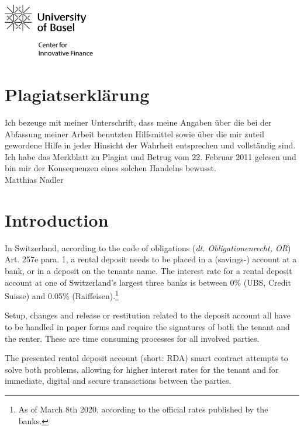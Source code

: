 \documentclass[12pt,a4paper,titlepage,oneside,english]{article}
\begin{document}
\newpage
{}
\tableofcontents
\vfill
\begin{center}
\includegraphics[width=4cm]{../assetlib/images/logo_cif.png}
\end{center}
\singlespacing
\vspace{-1.5cm}
\section*{Plagiatserklärung}
Ich bezeuge mit meiner Unterschrift, dass meine Angaben über die bei der Abfassung meiner Arbeit benutzten Hilfsmittel sowie über die mir zuteil gewordene Hilfe in jeder Hinsicht der Wahrheit entsprechen und vollständig sind. Ich habe das Merkblatt zu Plagiat und Betrug vom 22. Februar 2011 gelesen und bin mir der Konsequenzen eines solchen Handelns bewusst.\\

Matthias Nadler

\newpage
\onehalfspacing
{}



\section{Introduction}
\label{sec:introduction}
In Switzerland, according to the code of obligations (\textit{dt. Obligationenrecht, OR})  Art. 257e para. 1, a rental deposit needs to be placed in a (savings-) account at a bank, or in a deposit on the tenants name. The interest rate for a rental deposit account at one of Switzerland's largest three banks is between 0\% (UBS, Credit Suisse) and 0.05\% (Raiffeisen).\footnote{As of March 8th 2020, according to the official rates published by the banks.}

Setup, changes and release or restitution related to the deposit account all have to be handled in paper forms and require the signatures of both the tenant and the renter. These are time consuming processes for all involved parties.

The presented rental deposit account (short: RDA) smart contract attempts to solve both problems, allowing for higher interest rates for the tenant and for immediate, digital and secure transactions between the parties. 
\end{document}
